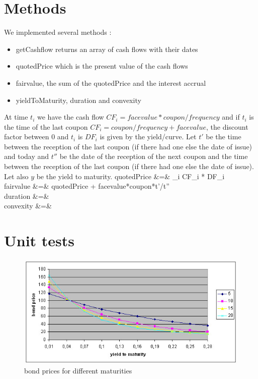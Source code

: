 \section{Methods}
We implemented several methods :
\begin{itemize}
	\item getCashflow returns an array of cash flows with their dates
	\item quotedPrice which is the present value of the cash flows
	\item fairvalue, the sum of the quotedPrice and the interest accrual
	\item yieldToMaturity, duration and convexity
\end{itemize}
At time $t_i$ we have the cash flow $CF_i=facevalue*coupon/frequency$ and if $t_i$ is the time of the last coupon $CF_i=coupon/frequency + facevalue$, the discount factor between 0 and $t_i$ is $DF_i$ is given by the yield/curve.
Let $t'$ be the time between the reception of the last coupon (if there had one else the date of issue) and today and $t''$ be the date of the reception of the next coupon and the time between the reception of the last coupon (if there had one else the date of issue). Let also $y$ be the yield to maturity.
\bes
quotedPrice &=& \sum_i CF_i * DF_i\\
fairvalue &=& quotedPrice + facevalue*coupon*t'/t''\\
duration &=& \\
convexity &=& 
\ens
\section{Unit tests}

\begin{figure}
\begin{center}
        \includegraphics[width=12cm]{bondprice.jpg}
        \caption{bond prices for different maturities}
\end{center}
\end{figure}

